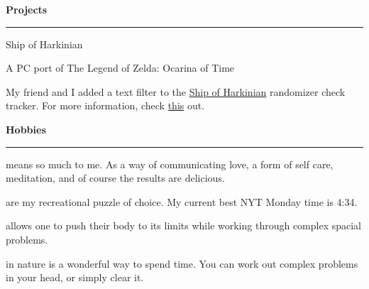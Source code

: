 \documentclass[letterpaper]{article}
\newcommand{\primary}{\color{primary}}
\newcommand{\primarydark}{\color{primarydark}}
\newcommand{\complementary}{\color{complementary}}
\newenvironment{heading}[1]{%
  {\LARGE \primarydark \textbf{#1}}\\ {\complementary
    \rule[5pt]{\linewidth}{0.6pt}}
}
{\par\vspace{8pt}}
\newcommand{\blockend}{\vspace{4pt}}
\newenvironment{project}[2]{%
  { #1 \par }
  { \small \primary #2 \par }%
}{
  \blockend{}
}
\newenvironment{prose}{\small}{\par}
\newcommand{\hobby}[2]{%
  {\small {\primarydark{#1}} #2} \par \vspace{2pt}
}
\begin{document}
\begin{minipage}[t]{0.39\textwidth}
\begin{heading}{Projects}
    \begin{project}{Ship of Harkinian}
      {A PC port of The Legend of Zelda: Ocarina of Time}%
      \begin{prose}
        My friend and I added a text filter to the
        \href{https://www.shipofharkinian.com/}{Ship of Harkinian} randomizer
        check tracker. For more information, check
        \href{https://michael.stergianis.ca/posts/adding-a-text-filter-to-the-ship-of-harkinian-randomizer-check-tracker/}{this}
        out.
      \end{prose}
    \end{project}
  \end{heading}
  \begin{heading}{Hobbies}
    \hobby{Cooking}{means so much to me. As a way of communicating love, a form
      of self care, meditation, and of course the results are delicious.}

    \hobby{Crosswords}{are my recreational puzzle of choice. My current best NYT
      Monday time is 4:34.}

    \hobby{Bouldering}{allows one to push their body to its limits while working
    through complex spacial problems.}

    \hobby{Hiking}{in nature is a wonderful way to spend time. You can work out
      complex problems in your head, or simply clear it.}
  \end{heading}
\end{minipage}
\end{document}
